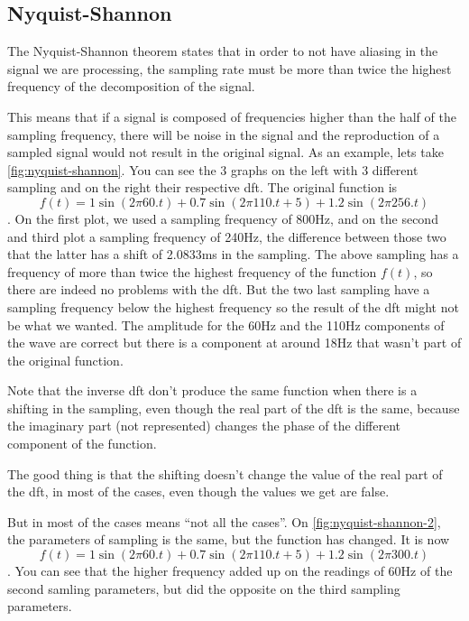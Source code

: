 \subsection{Nyquist-Shannon}\label{section:nyquist}
The Nyquist-Shannon theorem states that in order to not have aliasing in the signal we are processing, the sampling rate must be more than twice the highest frequency of the decomposition of the signal.

This means that if a signal is composed of frequencies higher than the half of the sampling frequency, there will be noise in the signal and the reproduction of a sampled signal would not result in the original signal. As an example, lets take \autoref{fig:nyquist-shannon}. You can see the 3 graphs on the left with 3 different sampling and on the right their respective \acrlong{dft}. The original function is $$f(t) = 1\sin(2\pi60.t) + 0.7\sin(2\pi110.t+5) + 1.2\sin(2\pi256.t)$$. On the first plot, we used a sampling frequency of 800Hz, and on the second and third plot a sampling frequency of 240Hz, the difference between those two that the latter has a shift of 2.0833ms in the sampling. The above sampling has a frequency of more than twice the highest frequency of the function $f(t)$, so there are indeed no problems with the \acrshort{dft}. But the two last sampling have a sampling frequency below the highest frequency so the result of the \acrshort{dft} might not be what we wanted. The amplitude for the 60Hz and the 110Hz components of the wave are correct but there is a component at around 18Hz that wasn't part of the original function.

Note that the inverse \acrshort{dft} don't produce the same function when there is a shifting in the sampling, even though the real part of the \acrshort{dft} is the same, because the imaginary part (not represented) changes the phase of the different component of the function.

The good thing is that the shifting doesn't change the value of the real part of the \acrshort{dft}, in most of the cases, even though the values we get are false.

But in most of the cases means “not all the cases”. On \autoref{fig:nyquist-shannon-2}, the parameters of sampling is the same, but the function has changed. It is now $$f(t) = 1\sin(2\pi60.t) + 0.7\sin(2\pi110.t+5) + 1.2\sin(2\pi300.t)$$. You can see that the higher frequency added up on the readings of 60Hz of the second samling parameters, but did the opposite on the third sampling parameters.



